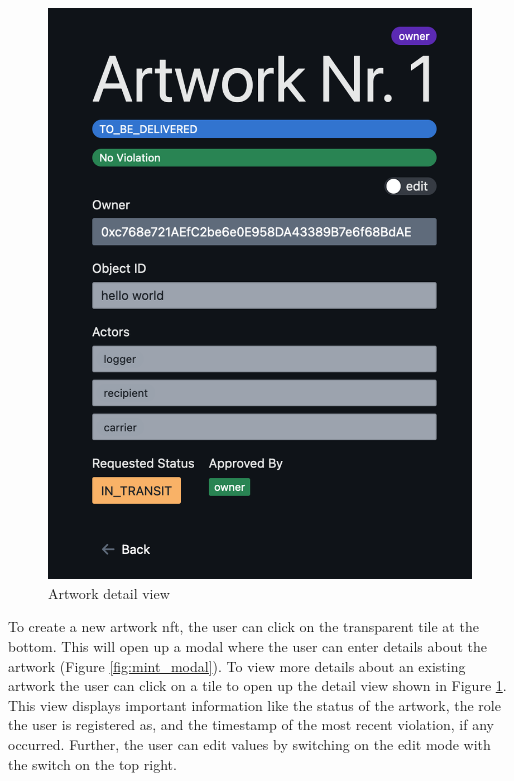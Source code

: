 \begin{figure}
\begin{minipage}{0.45\textwidth}
        \includegraphics[height=0.4\textheight]{resources/frontend_screenshots/artwork_details.png}
        \caption{Artwork detail view}
        \label{fig:artwork_detail}
    \end{minipage}
\end{figure}

To create a new artwork \gls{nft}, the user can click on the transparent tile at the bottom. This will open up a modal where the user can enter details about the artwork (Figure \ref{fig:mint_modal}). To view more details about an existing artwork the user can click on a tile to open up the detail view shown in Figure \ref{fig:artwork_detail}. This view displays important information like the status of the artwork, the role the user is registered as, and the timestamp of the most recent violation, if any occurred. Further, the user can edit values by switching on the edit mode with the switch on the top right.  

